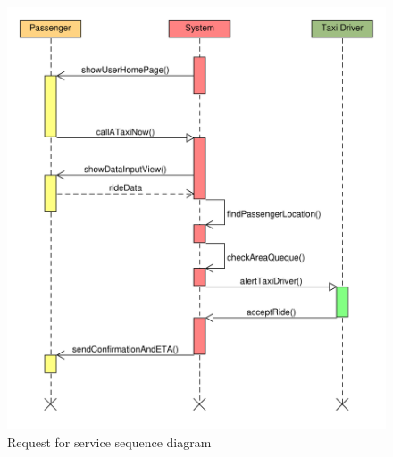 \begin{figure}
\centering
\includegraphics[width=\textwidth]{tex-images/sequence-rfs}
\caption{Request for service sequence diagram}
\end{figure}



